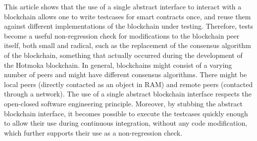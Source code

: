 This article shows that the use of a single abstract interface to
interact with a blockchain allows one
to write testcases for smart contracts once,
and reuse them against different implementations of the blockchain
under testing. Therefore, tests become a useful non-regression check
for modifications to the blockchain peer itself, both small and radical,
such as the replacement of the consensus algorithm of the blockchain,
something that actually occurred
during the development of the Hotmoka blockchain.
In general, blockchains might consist of a varying number of peers
and might have different consensus algorithms. There might be
local peers (directly contacted
as an object in RAM) and remote peers (contacted through a network).
The use of a single abstract blockchain interface
respects the open-closed software engineering
principle. Moreover, by stubbing the abstract blockchain interface,
it becomes possible to execute the
testcases quickly enough to allow their use during continuous integration,
without any code modification, which further supports their use as a
non-regression check.
